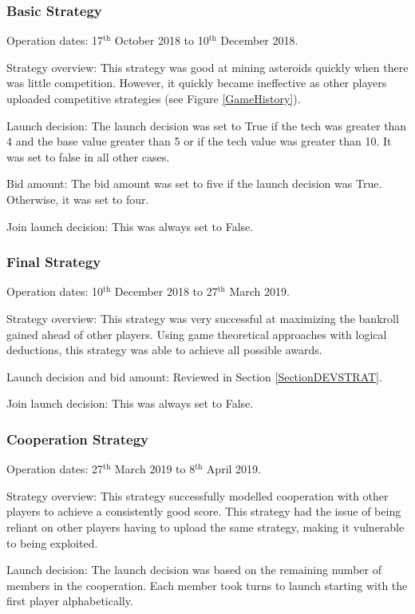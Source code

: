 \documentclass[11pt, twoside]{article}
\begin{document}
\subsubsection*{Basic Strategy}
Operation dates: 17$^{\text{th}}$ October 2018 to 10$^{\text{th}}$  December 2018.

Strategy overview: This strategy was good at mining asteroids quickly when there was little competition. However, it quickly became ineffective as other players uploaded competitive strategies (see Figure \ref{GameHistory}).

Launch decision: The launch decision was set to True if the tech was greater than 4 and the base value greater than 5 or if the tech value was greater than 10. It was set to false in all other cases.

Bid amount: The bid amount was set to five if the launch decision was True. Otherwise, it was set to four.

Join launch decision: This was always set to False.

\subsubsection*{Final Strategy}
Operation dates: 10$^{\text{th}}$ December 2018 to 27$^{\text{th}}$ March 2019.

Strategy overview: This strategy was very successful at maximizing the bankroll gained ahead of other players. Using game theoretical approaches with logical deductions, this strategy was able to achieve all possible awards.

Launch decision and bid amount: Reviewed in Section \ref{SectionDEVSTRAT}.

Join launch decision: This was always set to False.

\subsubsection*{Cooperation Strategy}
Operation dates: 27$^{\text{th}}$ March 2019 to 8$^{\text{th}}$ April 2019.

Strategy overview: This strategy successfully modelled cooperation with other players to achieve a consistently good score. This strategy had the issue of being reliant on other players having to upload the same strategy, making it vulnerable to being exploited. 

Launch decision: The launch decision was based on the remaining number of members in the cooperation. Each member took turns to launch starting with the first player alphabetically.
\end{document}
